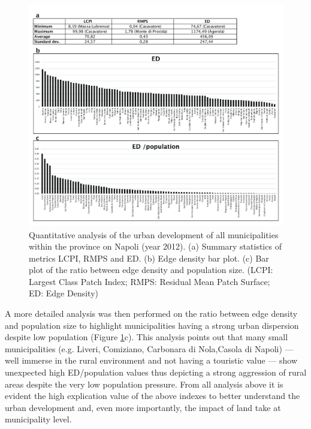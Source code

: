 \documentclass[APA,LATO1COL,doublespace]{WileyNJD-v2}
\begin{document}
\begin{figure}
    \centerline{
        \includegraphics[width=450pt]{08_caso_comunale_tabella_grafici.pdf}
    }
    \caption{Quantitative analysis of the urban development of all municipalities within the province on Napoli (year 2012).
             (a) Summary statistics of metrics LCPI, RMPS and ED.
             (b) Edge density bar plot.
             (c) Bar plot of the ratio between edge density and population size.
             (LCPI: Largest Class Patch Index; 
             RMPS: Residual Mean Patch Surface; 
             ED: Edge Density)
            }
    \label{fig:caseCOM_urbDev}
\end{figure}

A more detailed analysis was then performed on the ratio between edge density and population size to highlight municipalities having a strong urban dispersion despite low population (Figure \ref{fig:caseCOM_urbDev}c).
This analysis points out that many small municipalities (e.g. Liveri, Comiziano, Carbonara di Nola,Casola di Napoli) --- well immerse in the rural environment and not having a touristic value --- show unexpected high ED/population values thus depicting a strong aggression of rural areas despite the very low population pressure.
From all analysis above it is evident the high explication value of the above indexes to better understand the urban development and, even more importantly, the impact of land take at municipality level.
\end{document}
